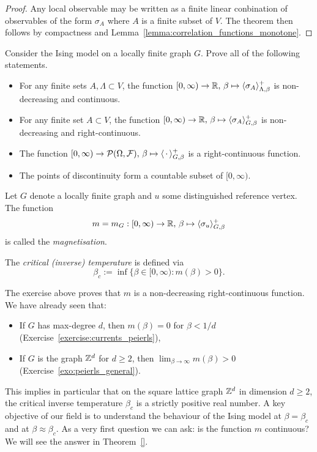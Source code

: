 \begin{proof}
    Any local observable may be written as a finite linear conbination
    of observables of the form $\sigma_A$ where $A$ is a finite subset of
    $V$.
    The theorem then follows by compactness and Lemma~\ref{lemma:correlation_functions_monotone}.
\end{proof}

\begin{exercise}
    Consider the Ising model on a locally finite graph $G$.
    Prove all of the following statements.
    \begin{itemize}
        \item For any finite sets $A,\Lambda\subset V$,
        the function $[0,\infty)\to\mathbb R,\,\beta\mapsto\langle\sigma_A\rangle_{\Lambda,\beta}^+$
        is non-decreasing and continuous.
        \item For any finite set $A\subset V$,
        the function $[0,\infty)\to\mathbb R,\,\beta\mapsto\langle\sigma_A\rangle_{G,\beta}^+$
        is non-decreasing and right-continuous.
        \item The function $[0,\infty)\to\mathcal P(\Omega,\mathcal F),\,\beta\mapsto\langle\,\cdot\,\rangle_{G,\beta}^+$
        is a right-continuous function.
        \item The points of discontinuity form a countable subset of $[0,\infty)$.
    \end{itemize}
\end{exercise}

\begin{definition}
    Let $G$ denote a locally finite graph and $u$ some distinguished reference vertex.
    The function
    \[
        m=m_G:[0,\infty)\to\mathbb R,\,\beta\mapsto\langle\sigma_u\rangle_{G,\beta}^+
    \]
    is called the \emph{magnetisation}.

    The \emph{critical (inverse) temperature} is defined via
    \[
        \beta_c:=\inf\{\beta\in[0,\infty):m(\beta)>0\}.
    \]
\end{definition}

\begin{remark}
    The exercise above proves that $m$ is a non-decreasing right-continuous function.
    We have already seen that:
    \begin{itemize}
        \item If $G$ has max-degree $d$,
        then $m(\beta)=0$ for $\beta<1/d$ (Exercise~\ref{exercise:currents_peierls}),
        \item If $G$ is the graph $\mathbb Z^d$ for $d\geq 2$,
        then $\lim_{\beta\to\infty}m(\beta)>0$ (Exercise~\ref{exo:peierls_general}).
    \end{itemize}
    This implies in particular that on the square lattice graph $\mathbb Z^d$ in dimension
    $d\geq 2$,
    the critical inverse temperature $\beta_c$ is a strictly positive real number.
    A key objective of our field is to understand the behaviour of the Ising model
    at $\beta=\beta_c$ and at $\beta\approx\beta_c$.
    As a very first question we can ask:
    is the function $m$ continuous?
    We will see the answer in Theorem~\ref{}.
\end{remark}
